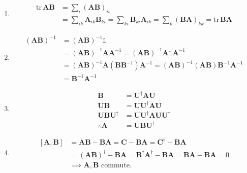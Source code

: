 \documentclass[12pt]{article}
\begin{document}
\begin{enumerate}
\setlength{\itemsep}{4pt}
\item[a.] 
    \[
    \begin{split}
        \text{tr}\,\mathbf{AB}  & = \sum_i (\mathbf{AB})_{ii} \\[1em]
        & = \sum_{ik}\mathbf{A}_{ik}\mathbf{B}_{ki} = \sum_{ki}\mathbf{B}_{ki}\mathbf{A}_{ik} = \sum_k (\mathbf{BA})_{kk} = \text{tr}\,\mathbf{BA}
    \end{split}
    \]


\item[b.]
    \[
    \begin{split}
        (\mathbf{AB})^{-1} 
        & = (\mathbf{AB})^{-1} \mathds{1} \\[1em]
        & = (\mathbf{AB})^{-1} \mathbf{A} \mathbf{A}^{-1} 
        = (\mathbf{AB})^{-1} \mathbf{A} \mathds{1} \mathbf{A}^{-1} \\[1em]
        & = (\mathbf{AB})^{-1} \mathbf{A} (\mathbf{B} \mathbf{B}^{-1}) \mathbf{A}^{-1}
        = (\mathbf{AB})^{-1} (\mathbf{AB}) \mathbf{B}^{-1} \mathbf{A}^{-1} \\[1em]
        & = \mathbf{B}^{-1}\mathbf{A}^{-1}
    \end{split}
    \]

\item[c.]
    \[
    \begin{split}
        \mathbf{B} & = \mathbf{U}^{\dagger}\mathbf{AU} \\[1em]
        \mathbf{U} \mathbf{B} & = \mathbf{U} \mathbf{U}^{\dagger}\mathbf{AU} \\[1em]
        \mathbf{U} \mathbf{B}\mathbf{U}^{\dagger} & = \mathbf{U} \mathbf{U}^{\dagger} \mathbf{AU}\mathbf{U}^{\dagger} \\[1em]
        \therefore \mathbf{A} & = \mathbf{UBU}^{\dagger}
    \end{split}
    \]

\item[d.]
    \[
    \begin{split}
        [\mathbf{A},\mathbf{B}] &= \mathbf{AB} - \mathbf{BA} = \mathbf{C} - \mathbf{BA} = \mathbf{C}^\dagger - \mathbf{BA}\\[1em]
        & = (\mathbf{AB})^\dagger - \mathbf{BA} = \mathbf{B}^\dagger \mathbf{A}^\dagger - \mathbf{BA}= \mathbf{BA} - \mathbf{BA} = 0\\[1em]
        & \implies \mathbf{A},\mathbf{B} \text{ commute.}
    \end{split}
    \]


\end{enumerate}
\end{document}
